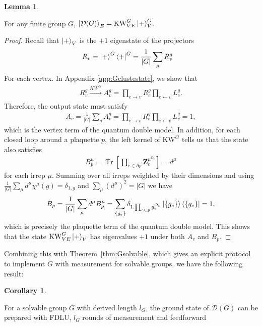 \documentclass[nofootinbib,prx,twocolumn,showpacs,superscriptaddress,notitlepage,amsmath,amssymb]{revtex4-2}
\theoremstyle{definition}
\def\KW{\text{KW}}
\def\bra#1{\mathinner{\langle{#1}|}}
\def\ket#1{\mathinner{|{#1}\rangle}}
\def\bs#1{\boldsymbol{#1}}
\DeclareMathOperator{\Tr}{Tr}
\newtheorem{cor}[theorem]{Corollary}
\newtheorem{lemma}[theorem]{Lemma}
\begin{document}
\begin{lemma}
\begin{shaded}
  For any finite group $G$, $\ket{ \mathcal D(G)}_E = \KW^G_{VE} \ket{+}^G_V$. 
  \end{shaded}
\begin{proof}
   Recall that $\ket{+}_V$ is the $+1$ eigenstate of the projectors
\begin{align}
    R_v &= \ket{+}^G\bra{+}^G= \frac{1}{|G|}\sum_g R^g_v
\end{align}
For each vertex. In Appendix \ref{app:Gclustestate}, we show that
\begin{align}
   R^g_v \xrightarrow[]{KW^G}  A_v^g =\prod_{e\rightarrow v} R^g_e\prod_{e\leftarrow v} L^g_e.
   \label{eq:LgtoAg}
\end{align}
Therefore, the output state must satisfy
\begin{align}
    A_v = \frac{1}{|G|} \sum_g A_v^g =\prod_{e\rightarrow v} R^g_e\prod_{e\leftarrow v} L^g_v =1,
\end{align}
which is the vertex term of the quantum double model. In addition, for each closed loop around a plaquette $p$, the left kernel of $\KW^G$ tells us that the state also satisfies
\begin{align}
     B_p^\mu =\Tr\left [\prod_{e\in \partial p}  \bs Z_e^{\mu^{O_e}}\right]  =d^\mu
\end{align}
for each irrep $\mu$. Summing over all irreps weighted by their dimensions and using $\frac{1}{|G|}\sum_\mu d^\mu \chi^\mu(g) =\delta_{1,g}$ and $\sum_\mu (d^\mu)^2 = |G|$ we have
\begin{align}
     B_p =\frac{1}{|G|} \sum_\mu d^\mu   B_p^\mu = \sum_{\{g_e\}}\delta_{1,  \prod_{e \subset p}  g_e^{O_e}} \ket{\{g_e\}}\bra{\{g_e\}} =1,
\end{align}
which is precisely the plaquette term of the quantum double model. This shows that the state $\KW^G_{VE} \ket{+}_V$ has eigenvalues $+1$ under both $A_v$ and $B_p$.
\end{proof}
\end{lemma}

Combining this with Theorem~\ref{thm:Gsolvable}, which gives an explicit protocol to implement $G$ with measurement for solvable groups, we have the following result:

\begin{cor}
\begin{shaded}
    For a solvable group $G$ with derived length $l_G$, the ground state of $\mathcal D(G)$ can be prepared with FDLU, $l_G$ rounds of measurement and feedforward
    \end{shaded}
\end{cor}
\end{document}
